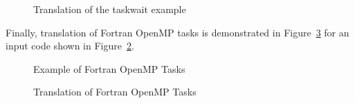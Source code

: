 \begin{figure}[htbp]
{\indent
  {\mySmallFontSize
    \begin{latexonly}
    
    \end{latexonly}
    \begin{htmlonly}
    
    \end{htmlonly}
  }
}
\caption{Translation of the taskwait example}
\label{Manual:omp:task_wait-trans}
\end{figure}

\clearpage
Finally, translation of Fortran OpenMP tasks
is demonstrated in
Figure~\ref{Manual:omp:task-trans-f} for an input code shown in
Figure~\ref{Manual:omp:task-f}. 

\lstset{language=Fortran,basicstyle=\scriptsize}
\lstset{language=Fortran,basicstyle=\scriptsize,numbers=left}
\begin{figure}[htbp]
{\indent
  {\mySmallFontSize
    \begin{latexonly}
    
    \end{latexonly}
    \begin{htmlonly}
    
    \end{htmlonly}
  }
}
\caption{Example of Fortran OpenMP Tasks}
\label{Manual:omp:task-f}
\end{figure}

\begin{figure}[htbp]
{\indent
  {\mySmallFontSize
    \begin{latexonly}
    
    \end{latexonly}
    \begin{htmlonly}
    
    \end{htmlonly}
  }
}
\caption{Translation of Fortran OpenMP Tasks}
\label{Manual:omp:task-trans-f}
\end{figure}


\clearpage
